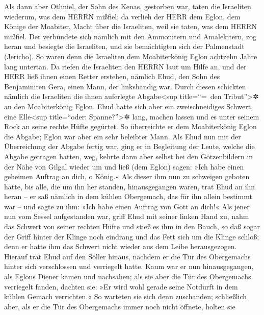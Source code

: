 Als dann aber Othniel, der Sohn des Kenas, gestorben war,
taten die Israeliten wiederum, was dem HERRN mißfiel; da
verlieh der HERR dem Eglon, dem Könige der Moabiter, Macht über die
Israeliten, weil sie taten, was dem HERRN mißfiel. Der
verbündete sich nämlich mit den Ammonitern und Amalekitern, zog heran
und besiegte die Israeliten, und sie bemächtigten sich der Palmenstadt
(Jericho). So waren denn die Israeliten dem Moabiterkönig
Eglon achtzehn Jahre lang untertan. Da riefen die
Israeliten den HERRN laut um Hilfe an, und der HERR ließ ihnen einen
Retter erstehen, nämlich Ehud, den Sohn des Benjaminiten Gera, einen
Mann, der linkshändig war. Durch diesen schickten nämlich die Israeliten
die ihnen auferlegte Abgabe\textless sup title=``=~den
Tribut''\textgreater✲ an den Moabiterkönig Eglon. Ehud
hatte sich aber ein zweischneidiges Schwert, eine Elle\textless sup
title=``oder: Spanne?''\textgreater✲ lang, machen lassen und es unter
seinem Rock an seine rechte Hüfte gegürtet. So
überreichte er dem Moabiterkönig Eglon die Abgabe; Eglon war aber ein
sehr beleibter Mann. Als Ehud nun mit der Überreichung
der Abgabe fertig war, ging er in Begleitung der Leute, welche die
Abgabe getragen hatten, weg, kehrte dann aber selbst bei
den Götzenbildern in der Nähe von Gilgal wieder um und ließ (dem Eglon)
sagen: »Ich habe einen geheimen Auftrag an dich, o König.« Als dieser
ihm nun zu schweigen geboten hatte, bis alle, die um ihn her standen,
hinausgegangen waren, trat Ehud an ihn heran -- er saß
nämlich in dem kühlen Obergemach, das für ihn allein bestimmt war -- und
sagte zu ihm: »Ich habe einen Auftrag von Gott an dich!« Als jener nun
vom Sessel aufgestanden war, griff Ehud mit seiner linken
Hand zu, nahm das Schwert von seiner rechten Hüfte und stieß es ihm in
den Bauch, so daß sogar der Griff hinter der Klinge noch
eindrang und das Fett sich um die Klinge schloß; denn er hatte ihm das
Schwert nicht wieder aus dem Leibe herausgezogen. Hierauf
trat Ehud auf den Söller hinaus, nachdem er die Tür des Obergemachs
hinter sich verschlossen und verriegelt hatte. Kaum war
er nun hinausgegangen, als Eglons Diener kamen und nachsahen; als sie
aber die Tür des Obergemachs verriegelt fanden, dachten sie: »Er wird
wohl gerade seine Notdurft in dem kühlen Gemach verrichten.«
So warteten sie sich denn zuschanden; schließlich aber,
als er die Tür des Obergemachs immer noch nicht öffnete, holten sie
